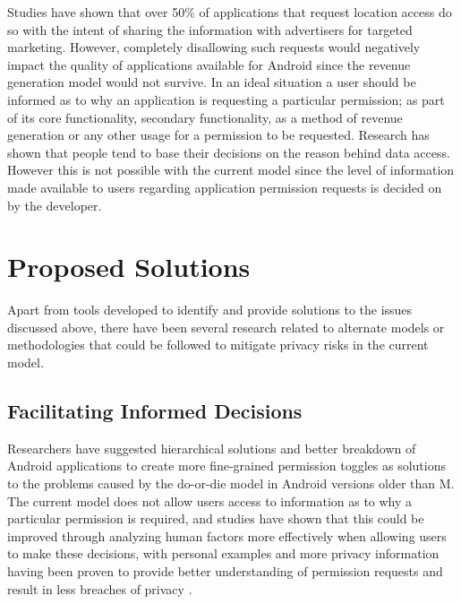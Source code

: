 Studies have shown that over 50\% of applications that request location access do so with the intent of sharing the information with advertisers for targeted marketing\cite{saint201050}. However, completely disallowing such requests would negatively impact the quality of applications available for Android since the revenue generation model would not survive. \cite{aa} In an ideal situation a user should be informed as to why an application is requesting a particular permission; as part of its core functionality, secondary functionality, as a method of revenue generation or any other usage for a permission to be requested. Research has shown that people tend to base their decisions on the reason behind data access\cite{lin2014modeling}. However this is not possible with the current model since the level of information made available to users regarding application permission requests is decided on by the developer.

\section{Proposed Solutions}
Apart from tools developed to identify and provide solutions to the issues discussed above, there have been several research related to alternate models or methodologies that could be followed to mitigate privacy risks in the current model.

\subsection{Facilitating Informed Decisions}
Researchers have suggested hierarchical solutions\cite{barrera2010methodology} and better breakdown of Android applications to create more fine-grained permission toggles\cite{bugiel2013flexible} as solutions to the problems caused by the do-or-die model in Android versions older than M. The current model does not allow users access to information as to why a particular permission is required, and studies have shown that this could be improved through analyzing human factors more effectively when allowing users to make these decisions, with personal examples and more privacy information having been proven to provide better understanding of permission requests and result in less breaches of privacy\cite{kelley2013privacy} \cite{harbach2014using}.  

